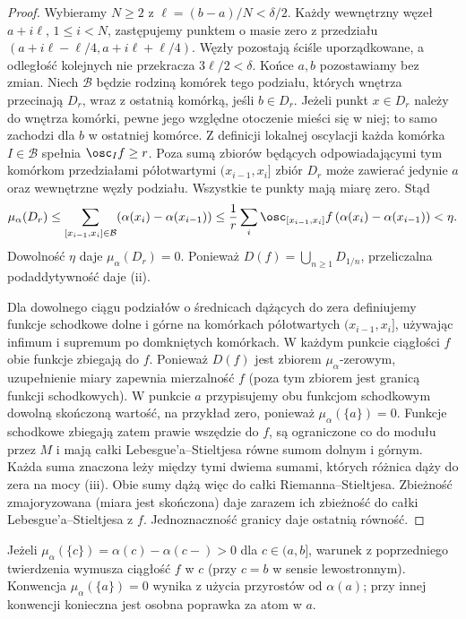 \begin{proof}
Wybieramy $N\ge2$ z $\ell=(b-a)/N<\delta/2$. Każdy wewnętrzny węzeł $a+i\ell$, $1\le i<N$, zastępujemy punktem o masie zero z przedziału $(a+i\ell-\ell/4,a+i\ell+\ell/4)$. Węzły pozostają ściśle uporządkowane, a odległość kolejnych nie przekracza $3\ell/2<\delta$. Końce $a,b$ pozostawiamy bez zmian. Niech $\mathcal B$ będzie rodziną komórek tego podziału, których wnętrza przecinają $D_r$, wraz z ostatnią komórką, jeśli $b\in D_r$. Jeżeli punkt $x\in D_r$ należy do wnętrza komórki, pewne jego względne otoczenie mieści się w niej; to samo zachodzi dla $b$ w ostatniej komórce. Z definicji lokalnej oscylacji każda komórka $I\in\mathcal B$ spełnia $\osc_I f\ge r$. Poza sumą zbiorów będących odpowiadającymi tym komórkom przedziałami półotwartymi $(x_{i-1},x_i]$ zbiór $D_r$ może zawierać jedynie $a$ oraz wewnętrzne węzły podziału. Wszystkie te punkty mają miarę zero. Stąd
\[
 \mu_\alpha(D_r)\le\sum_{[x_{i-1},x_i]\in\mathcal B}
 (\alpha(x_i)-\alpha(x_{i-1}))
 \le\frac1r\sum_i\osc_{[x_{i-1},x_i]}f\,(\alpha(x_i)-\alpha(x_{i-1}))<\eta.
\]
Dowolność $\eta$ daje $\mu_\alpha(D_r)=0$. Ponieważ $D(f)=\bigcup_{n\ge1}D_{1/n}$, przeliczalna podaddytywność daje (ii).

Dla dowolnego ciągu podziałów o średnicach dążących do zera definiujemy funkcje schodkowe dolne i górne na komórkach półotwartych $(x_{i-1},x_i]$, używając infimum i supremum po domkniętych komórkach. W każdym punkcie ciągłości $f$ obie funkcje zbiegają do $f$. Ponieważ $D(f)$ jest zbiorem $\mu_\alpha$-zerowym, uzupełnienie miary zapewnia mierzalność $f$ (poza tym zbiorem jest granicą funkcji schodkowych). W punkcie $a$ przypisujemy obu funkcjom schodkowym dowolną skończoną wartość, na przykład zero, ponieważ $\mu_\alpha(\{a\})=0$. Funkcje schodkowe zbiegają zatem prawie wszędzie do $f$, są ograniczone co do modułu przez $M$ i mają całki Lebesgue'a--Stieltjesa równe sumom dolnym i górnym. Każda suma znaczona leży między tymi dwiema sumami, których różnica dąży do zera na mocy (iii). Obie sumy dążą więc do całki Riemanna--Stieltjesa. Zbieżność zmajoryzowana (miara jest skończona) daje zarazem ich zbieżność do całki Lebesgue'a--Stieltjesa z $f$. Jednoznaczność granicy daje ostatnią równość.
\end{proof}
\begin{uwaga}
Jeżeli $\mu_\alpha(\{c\})=\alpha(c)-\alpha(c-)>0$ dla $c\in(a,b]$, warunek z poprzedniego twierdzenia wymusza ciągłość $f$ w $c$ (przy $c=b$ w sensie lewostronnym). Konwencja $\mu_\alpha(\{a\})=0$ wynika z użycia przyrostów od $\alpha(a)$; przy innej konwencji konieczna jest osobna poprawka za atom w $a$.
\end{uwaga}
